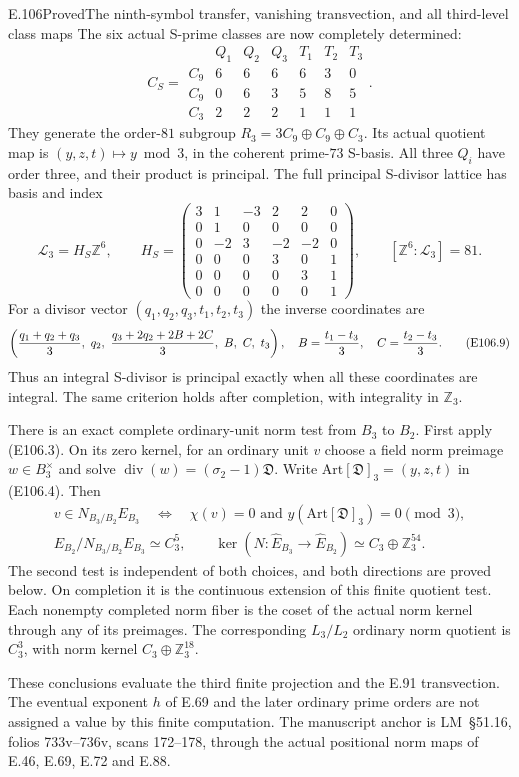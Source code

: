 \begin{statement}{E.106}{Proved}{The ninth-symbol transfer, vanishing transvection, and all third-level class maps}
The six actual S-prime classes are now completely determined:
\[
 C_S=
 \begin{array}{c|rrrrrr}
 &Q_1&Q_2&Q_3&T_1&T_2&T_3\\ \hline
 C_9&6&6&6&6&3&0\\
 C_9&0&6&3&5&8&5\\
 C_3&2&2&2&1&1&1
 \end{array}.
 \tag{E106.7}
\]
They generate the order-$81$ subgroup
$R_3=3C_9\oplus C_9\oplus C_3$. Its actual quotient map is
$(y,z,t)\mapsto y\bmod3$, in the coherent prime-$73$ S-basis.
All three $Q_i$ have order three, and their product is principal.
The full principal S-divisor lattice has basis and index
\[
 \mathcal L_3=H_S\mathbb Z^6,\qquad
 H_S=\begin{pmatrix}
 3&1&-3&2&2&0\\
 0&1&0&0&0&0\\
 0&-2&3&-2&-2&0\\
 0&0&0&3&0&1\\
 0&0&0&0&3&1\\
 0&0&0&0&0&1
 \end{pmatrix},\qquad
 [\mathbb Z^6:\mathcal L_3]=81 .
 \tag{E106.8}
\]
For a divisor vector $(q_1,q_2,q_3,t_1,t_2,t_3)$ the inverse
coordinates are
\[
 \left(
 {q_1+q_2+q_3\over3},\ q_2,\
 {q_3+2q_2+2B+2C\over3},\ B,\ C,\ t_3
 \right),\quad
 B={t_1-t_3\over3},\quad C={t_2-t_3\over3}.
 \tag{E106.9}
\]
Thus an integral S-divisor is principal exactly when all
these coordinates are integral. The same criterion holds
after completion, with integrality in $\mathbb Z_3$.

There is an exact complete ordinary-unit norm test from
$B_3$ to $B_2$. First apply (E106.3). On its zero kernel,
for an ordinary unit $v$ choose a field norm preimage
$w\in B_3^\times$ and solve
$\operatorname{div}(w)=(\sigma_2-1)\mathfrak D$.
Write $\mathrm{Art}[\mathfrak D]_3=(y,z,t)$ in (E106.4).
Then
\[
 \begin{gathered}
 v\in N_{B_3/B_2}E_{B_3}
   \quad\Longleftrightarrow\quad
   \chi(v)=0\text{ and }y(\mathrm{Art}[\mathfrak D]_3)=0\pmod3,\\
 E_{B_2}/N_{B_3/B_2}E_{B_3}\simeq C_3^5,\qquad
 \ker(N:\widehat E_{B_3}\to\widehat E_{B_2})
                     \simeq C_3\oplus\mathbb Z_3^{54}.
 \end{gathered}
 \tag{E106.10}
\]
The second test is independent of both choices, and both
directions are proved below. On completion it is the
continuous extension of this finite quotient test. Each
nonempty completed norm fiber is the coset of the actual
norm kernel through any of its preimages. The corresponding
$L_3/L_2$ ordinary norm quotient is $C_3^3$, with norm kernel
$C_3\oplus\mathbb Z_3^{18}$.

These conclusions evaluate the third finite projection and
the E.91 transvection. The eventual exponent $h$ of E.69
and the later ordinary prime orders are not assigned a
value by this finite computation. The manuscript anchor is
LM~\S51.16, folios 733v--736v, scans 172--178, through the actual
positional norm maps of E.46, E.69, E.72 and E.88.
\end{statement}

